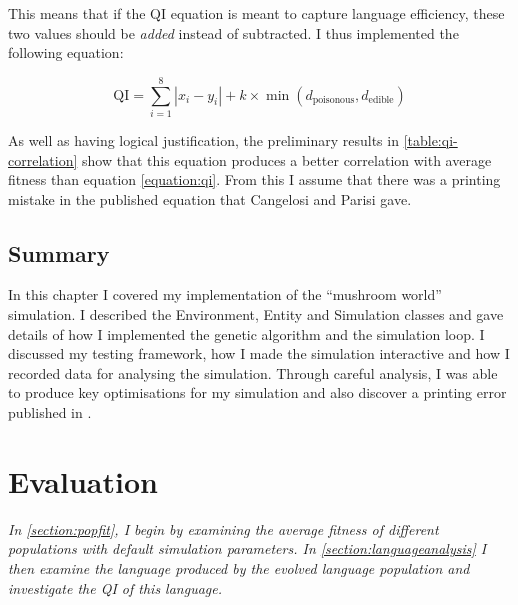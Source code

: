 \documentclass[12pt,a4paper]{report}
\begin{document}
This means that if the QI equation is meant to capture language efficiency, these two values should be \emph{added} instead of subtracted. I thus implemented the following equation:

\begin{equation}
\label{equation:qibetter}
\mathrm{QI} = \sum^{8}_{i = 1} |x_i - y_i| + k \times \min (d_{\mathrm{poisonous}}, d_{\mathrm{edible}})
\end{equation}

As well as having logical justification, the preliminary results in \cref{table:qi-correlation} show that this equation produces a better correlation with average fitness than equation \ref{equation:qi}. From this I assume that there was a printing mistake in the published equation that Cangelosi and Parisi gave. 

\section{Summary}

In this chapter I covered my implementation of the ``mushroom world'' simulation. I described the Environment, Entity and Simulation classes and gave details of how I implemented the genetic algorithm and the simulation loop. I discussed my testing framework, how I made the simulation interactive and how I recorded data for analysing the simulation. Through careful analysis, I was able to produce key optimisations for my simulation and also discover a printing error published in \citet{Cangelosi1998}.


\chapter{Evaluation}

\emph{In \cref{section:popfit}, I begin by examining the average fitness of different populations with default simulation parameters. In \cref{section:languageanalysis} I then examine the language produced by the evolved language population and investigate the QI of this language. }
\end{document}
